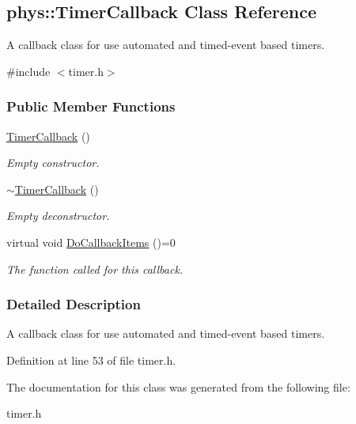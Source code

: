\hypertarget{classphys_1_1TimerCallback}{
\subsection{phys::TimerCallback Class Reference}
\label{d1/d18/classphys_1_1TimerCallback}
}


A callback class for use automated and timed-\/event based timers.  




{\ttfamily \#include $<$timer.h$>$}

\subsubsection*{Public Member Functions}
\begin{DoxyCompactItemize}
\item 
\hypertarget{classphys_1_1TimerCallback_a8500d48fd294a0513a0a401423e2c122}{
\hyperlink{classphys_1_1TimerCallback_a8500d48fd294a0513a0a401423e2c122}{TimerCallback} ()}
\label{d1/d18/classphys_1_1TimerCallback_a8500d48fd294a0513a0a401423e2c122}

\begin{DoxyCompactList}\small\item\em Empty constructor. \item\end{DoxyCompactList}\item 
\hypertarget{classphys_1_1TimerCallback_a97422dd56db0f37f2b4103ba83f1da9b}{
\hyperlink{classphys_1_1TimerCallback_a97422dd56db0f37f2b4103ba83f1da9b}{$\sim$TimerCallback} ()}
\label{d1/d18/classphys_1_1TimerCallback_a97422dd56db0f37f2b4103ba83f1da9b}

\begin{DoxyCompactList}\small\item\em Empty deconstructor. \item\end{DoxyCompactList}\item 
\hypertarget{classphys_1_1TimerCallback_a8ceb51cd1b902e243e35cff61f4ae9d9}{
virtual void \hyperlink{classphys_1_1TimerCallback_a8ceb51cd1b902e243e35cff61f4ae9d9}{DoCallbackItems} ()=0}
\label{d1/d18/classphys_1_1TimerCallback_a8ceb51cd1b902e243e35cff61f4ae9d9}

\begin{DoxyCompactList}\small\item\em The function called for this callback. \item\end{DoxyCompactList}\end{DoxyCompactItemize}


\subsubsection{Detailed Description}
A callback class for use automated and timed-\/event based timers. 

Definition at line 53 of file timer.h.



The documentation for this class was generated from the following file:\begin{DoxyCompactItemize}
\item 
timer.h\end{DoxyCompactItemize}
